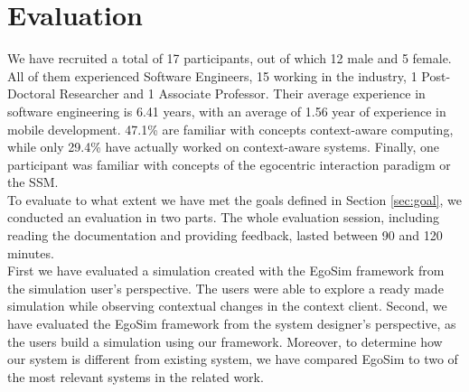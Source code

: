 \chapter{Evaluation}\label{ch:evaluation}
We have recruited a total of 17 participants, out of which 12 male and 5 female. All of them experienced Software Engineers, 15 working in the industry, 1 Post-Doctoral Researcher and 1 Associate Professor. Their average experience in software engineering is 6.41 years, with an average of 1.56 year of experience in mobile development. 47.1\% are familiar with concepts context-aware computing, while only 29.4\% have actually worked on context-aware systems. Finally, one participant was familiar with concepts of the egocentric interaction paradigm or the SSM.\\

To evaluate to what extent we have met the goals defined in Section \ref{sec:goal}, we conducted an evaluation in two parts. The whole evaluation session, including reading the documentation and providing feedback, lasted between 90 and 120 minutes.\\

First we have evaluated a simulation created with the EgoSim framework from the simulation user's perspective. The users were able to explore a ready made simulation while observing contextual changes in the context client. Second, we have evaluated the EgoSim framework from the system designer's perspective, as the users build a simulation using our framework. Moreover, to determine how our system is different from existing system, we have compared EgoSim to two of the most relevant systems in the related work.\\





